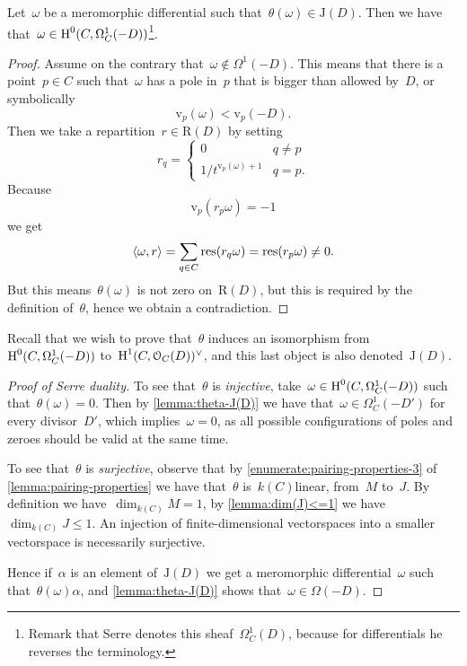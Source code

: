 \documentclass[10pt,a4paper]{article}
\begin{document}
\begin{lemma}
  \label{lemma:theta-J(D)}
  Let~$\omega$ be a meromorphic differential such that~$\theta(\omega)\in\mathrm{J}(D)$. Then we have that~$\omega\in\operatorname{H}^0(C,\Omega_C^1(-D))$\footnote{Remark that Serre denotes this sheaf~$\Omega_C^1(D)$, because for differentials he reverses the terminology.}.

  \begin{proof}
    Assume on the contrary that~$\omega\notin\Omega^1(-D)$. This means that there is a point~$p\in C$ such that~$\omega$ has a pole in~$p$ that is bigger than allowed by~$D$, or symbolically
    \begin{equation}
      \mathrm{v}_p(\omega)<\mathrm{v}_p(-D).
    \end{equation}
    Then we take a repartition~$r\in\mathrm{R}(D)$ by setting
    \begin{equation}
      r_q=
      \begin{cases}
        0 & q\neq p \\
        1/t^{\mathrm{v}_p(\omega)+1} & q=p.
      \end{cases}
    \end{equation}
    Because
    \begin{equation}
      \mathrm{v}_p(r_p\omega)=-1
    \end{equation}
    we get
    \begin{equation}
      \langle\omega,r\rangle=\sum_{q\in C}\operatorname{res}(r_q\omega)=\operatorname{res}(r_p\omega)\neq 0.
    \end{equation}
    But this means~$\theta(\omega)$ is not zero on~$\mathrm{R}(D)$, but this is required by the definition of~$\theta$, hence we obtain a contradiction.
  \end{proof}
\end{lemma}

Recall that we wish to prove that~$\theta$ induces an isomorphism from~$\operatorname{H}^0(C,\Omega_C^1(-D))$ to~$\operatorname{H}^1(C,\mathcal{O}_C(D))^\vee$, and this last object is also denoted~$\mathrm{J}(D)$.
\begin{proof}[Proof of Serre duality]
  To see that~$\theta$ is \emph{injective}, take~$\omega\in\operatorname{H}^0(C,\Omega_C^1(-D))$ such that~$\theta(\omega)=0$. Then by \cref{lemma:theta-J(D)} we have that~$\omega\in\Omega_C^1(-D')$ for every divisor~$D'$, which implies~$\omega=0$, as all possible configurations of poles and zeroes should be valid at the same time.

  To see that~$\theta$ is \emph{surjective}, observe that by \cref{enumerate:pairing-properties-3} of \cref{lemma:pairing-properties} we have that~$\theta$ is~$k(C)$\dash linear, from~$M$ to~$J$. By definition we have~$\dim_{k(C)}M=1$, by \cref{lemma:dim(J)<=1} we have~$\dim_{k(C)}J\leq 1$. An injection of finite-dimensional vectorspaces into a smaller vectorspace is necessarily surjective.

  Hence if~$\alpha$ is an element of~$\mathrm{J}(D)$ we get a meromorphic differential~$\omega$ such that~$\theta(\omega)\alpha$, and \cref{lemma:theta-J(D)} shows that~$\omega\in\Omega(-D)$.
\end{proof}
\end{document}
